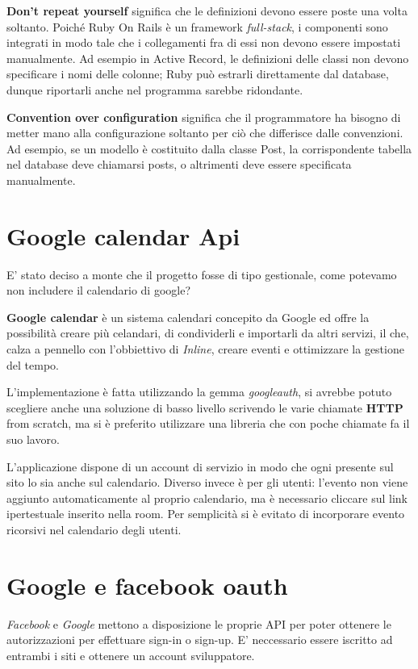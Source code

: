 	\textbf{Don't repeat yourself} significa che le definizioni devono essere poste una volta soltanto. Poiché Ruby On Rails è un framework \textit{full-stack}, i componenti sono integrati in modo tale che i collegamenti fra di essi non devono essere impostati manualmente. Ad esempio in Active Record, le definizioni delle classi non devono specificare i nomi delle colonne; Ruby può estrarli direttamente dal database, dunque riportarli anche nel programma sarebbe ridondante.
	
	\textbf{Convention over configuration} significa che il programmatore ha bisogno di metter mano alla configurazione soltanto per ciò che differisce dalle convenzioni. Ad esempio, se un modello è costituito dalla classe Post, la corrispondente tabella nel database deve chiamarsi posts, o altrimenti deve essere specificata manualmente.
	
	\section{Google calendar Api}
	E' stato deciso a monte che il progetto fosse di tipo gestionale, come potevamo non includere il calendario di google?
	
	\textbf{Google calendar} è un  sistema calendari concepito da Google ed offre la possibilità creare più celandari, di condividerli e importarli da altri servizi, il che, calza a pennello con l'obbiettivo di \textit{Inline}, creare eventi e ottimizzare la gestione del tempo.

	L'implementazione è fatta utilizzando la gemma \textit{googleauth}, si avrebbe potuto scegliere anche una soluzione di basso livello scrivendo le varie chiamate \textbf{HTTP} from scratch, ma si è preferito utilizzare una libreria che con poche chiamate fa il suo lavoro.
	
	L'applicazione dispone di un account di servizio in modo che ogni presente sul sito lo sia anche sul calendario. Diverso invece è per gli utenti: l'evento non viene aggiunto automaticamente al proprio calendario, ma è necessario cliccare sul link ipertestuale inserito nella room. Per semplicità si è evitato di incorporare evento ricorsivi nel calendario degli utenti.
	
	\section{Google e facebook oauth}
	\textit{Facebook} e \textit{Google} mettono a disposizione le proprie API per poter ottenere le autorizzazioni per effettuare sign-in o sign-up. E' neccessario essere iscritto ad entrambi i siti e ottenere un account sviluppatore.
	
